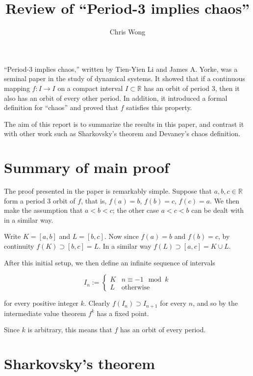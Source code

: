 \documentclass{article}
\newcommand{\R}{\mathbb{R}}
\begin{document}
\author{Chris Wong}
\title{Review of ``Period-3 implies chaos''}
\maketitle

``Period-3 implies chaos,''\cite{MR0385028} written by Tien-Yien Li and James A. Yorke, was a seminal paper in the study of dynamical systems. It showed that if a continuous mapping $f : I \rightarrow I$ on a compact interval $I \subset \R$ has an orbit of period 3, then it also has an orbit of every other period. In addition, it introduced a formal definition for ``chaos'' and proved that $f$ satisfies this property.

The aim of this report is to summarize the results in this paper, and contrast it with other work such as Sharkovsky's theorem and Devaney's chaos definition.

\section{Summary of main proof}

The proof presented in the paper is remarkably simple. Suppose that $a, b, c \in \R$ form a period 3 orbit of $f$, that is, $f(a) = b$, $f(b) = c$, $f(c) = a$. We then make the assumption that $a < b < c$; the other case $a < c < b$ can be dealt with in a similar way.

Write $K = [a, b]$ and $L = [b, c]$. Now since $f(a) = b$ and $f(b) = c$, by continuity $f(K) \supset [b, c] = L$. In a similar way $f(L) \supset [a, c] = K \cup L$.

After this initial setup, we then define an infinite sequence of intervals

\[
    I_n := \begin{cases}
        K & n \equiv -1 \mod k \\
        L & \textrm{otherwise}
    \end{cases}
\]

for every positive integer $k$. Clearly $f(I_n) \supset I_{n+1}$ for every $n$, and so by the intermediate value theorem $f^k$ has a fixed point.

Since $k$ is arbitrary, this means that $f$ has an orbit of every period.

\section{Sharkovsky's theorem}
\end{document}
